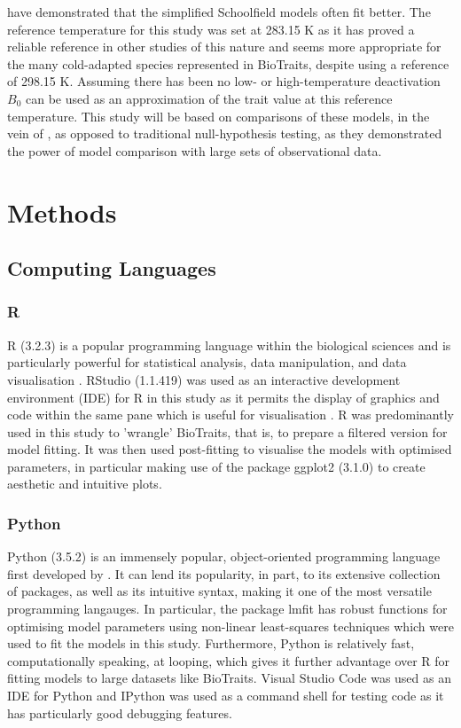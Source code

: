 \documentclass[twoside,twocolumn,11pt]{article}
\begin{document}
have demonstrated that the simplified Schoolfield models often fit better. The reference temperature for this study
was set at 283.15 K as it has proved a reliable reference in other studies of this nature \citep{Dell2011} 
and seems more appropriate for the many cold-adapted species represented in BioTraits, despite 
\cite{Schoolfield1981} using a reference of 298.15 K. Assuming there has been no low- or high-temperature deactivation 
$B_0$ can be used as an approximation of the trait value at this reference temperature.
This study will be based on comparisons of these models, in the vein of
\cite{Johnson2004}, as opposed to traditional null-hypothesis testing,
as they demonstrated the power of model comparison with large sets of observational data.


\section{Methods}

\subsection{Computing Languages}
\subsubsection{R}
R (3.2.3) is a popular programming language within the biological sciences and is particularly powerful for statistical
analysis, data manipulation, and data visualisation \citep{R2015}. RStudio (1.1.419) was used as an interactive 
development environment (IDE) for R in this study as it 
permits the display of graphics and code within the same pane which is useful for visualisation \citep{RStudio2016}.
R was predominantly used in this study to 'wrangle' BioTraits, that is, to prepare
a filtered version for model fitting. It was then used post-fitting to visualise the models with optimised parameters, in
particular making use of the package ggplot2 (3.1.0) \citep{ggplot22016} to create aesthetic and intuitive plots.

\subsubsection{Python}
Python (3.5.2) is an immensely popular, object-oriented programming language first developed by \cite{Python1991}. It can lend 
its popularity, in part, to its extensive collection of packages, as well as its intuitive syntax,
making it one of the most versatile programming langauges.
In particular, the package lmfit \citep{lmfit2014} has robust functions for optimising model parameters using non-linear 
least-squares techniques which were used to fit the models in this study. Furthermore, Python is relatively fast, computationally 
speaking, at looping,
which gives it further advantage over R for fitting models to large datasets like BioTraits. Visual Studio Code \citep{VSCode2019} 
was used as an IDE for Python and IPython \citep{IPython2007} was used as a command shell for testing code as it has 
particularly good debugging features.
\end{document}
